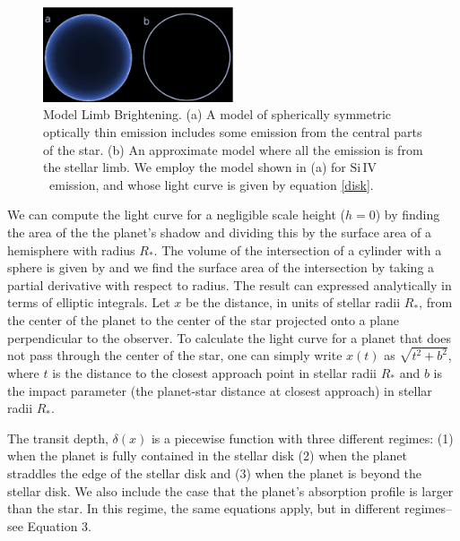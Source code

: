 \documentclass[twocolumn]{emulateapj}
\newcommand{\siIV}{\ensuremath{\mathrm{Si}\,\scriptstyle \mathrm{IV}}}
\begin{document}
\begin{figure}
\begin{center}
\includegraphics[width=0.5\textwidth]{model_comparison.eps}
\caption{Model Limb Brightening. (a) A model of spherically symmetric optically thin emission includes some emission from the central parts of the star. (b) An approximate model where all the emission is from the stellar limb. We employ the model shown in (a) for \siIV\ emission, and whose light curve is given by  equation \ref{disk}.}
\label{limbmodel}
\end{center}
\end{figure}


We can compute the light curve for a negligible scale height ($h=0$) by finding the area of the the planet's shadow and dividing this by the surface area of a hemisphere with radius $R_*$. The volume of the intersection of a cylinder with a sphere is given by \citet{lamarche} and we find the surface area of the intersection by taking a partial derivative with respect to radius. The result can expressed analytically in terms of elliptic integrals.
Let $x$ be the distance, in units of stellar radii $R_*$, from the center of the planet to the center of the star projected onto a plane perpendicular to the observer. To calculate the light curve for a planet that does not pass through the center of the star, one can simply write $x(t)$ as $\sqrt{t^2+b^2}$, where $t$ is the distance to the closest approach point in stellar radii $R_*$ and $b$ is the impact parameter (the planet-star distance at closest approach) in stellar radii $R_*$. 

The transit depth, $\delta (x)$ is a piecewise function with three different regimes: (1) when the planet is fully contained in the stellar disk (2) when the planet straddles the edge of the stellar disk and (3) when the planet is beyond the stellar disk. We also include the case that the planet's absorption profile is larger than the star. In this regime, the same equations apply, but in different regimes--see Equation 3.
\end{document}

